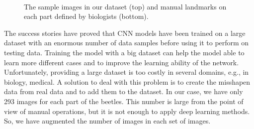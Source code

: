 \documentclass[review]{elsarticle}
\begin{document}
\begin{figure}[h!]
~~
~~
~\\
    \caption{The sample images in our dataset (top) and manual landmarks on each part defined by biologists (bottom).}
    \label{figdatasamples}
\end{figure}

The success stories \cite{krizhevsky2012imagenet, ciregan2012multi, szegedy2015going} have proved that CNN models have been trained on a large dataset with an enormous number of data samples before using it to perform on testing data. Training the model with a big dataset can help the model able to learn more different cases and to improve the learning ability of the network. Unfortunately, providing a large dataset is too costly in several domains, e.g., in biology, medical. A solution to deal with this problem is to create the misshapen data from real data and to add them to the dataset. In our case, we have only 293 images for each part of the beetles. This number is large from the point of view of manual operations, but it is not enough to apply deep learning methods. So, we have augmented the number of images in each set of images.
\end{document}
